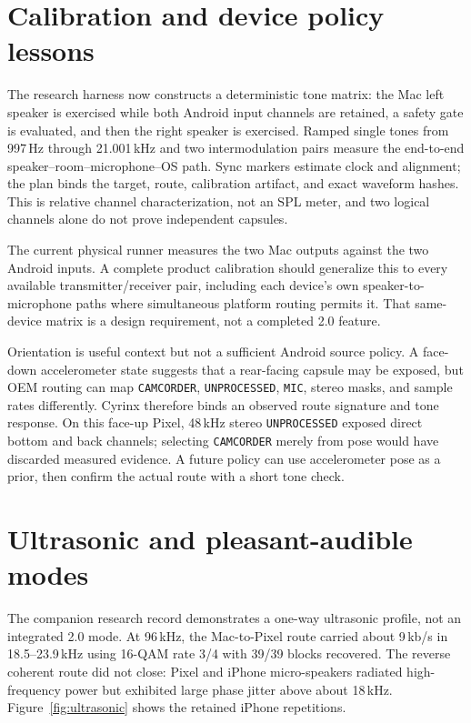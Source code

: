 \documentclass[11pt]{article}
\begin{document}
\section{Calibration and device policy lessons}
\label{sec:calibration}

The research harness now constructs a deterministic tone matrix: the Mac left
speaker is exercised while both Android input channels are retained, a safety
gate is evaluated, and then the right speaker is exercised. Ramped single
tones from 997\,Hz through 21.001\,kHz and two intermodulation pairs measure the
end-to-end speaker--room--microphone--OS path. Sync markers estimate clock and
alignment; the plan binds the target, route, calibration artifact, and exact
waveform hashes. This is relative channel characterization, not an SPL meter,
and two logical channels alone do not prove independent capsules.

The current physical runner measures the two Mac outputs against the two
Android inputs. A complete product calibration should generalize this to every
available transmitter/receiver pair, including each device's own speaker-to-
microphone paths where simultaneous platform routing permits it. That
same-device matrix is a design requirement, not a completed 2.0 feature.

Orientation is useful context but not a sufficient Android source policy. A
face-down accelerometer state suggests that a rear-facing capsule may be
exposed, but OEM routing can map \texttt{CAMCORDER}, \texttt{UNPROCESSED},
\texttt{MIC}, stereo masks, and sample rates differently. Cyrinx therefore
binds an observed route signature and tone response. On this face-up Pixel,
48\,kHz stereo \texttt{UNPROCESSED} exposed direct bottom and back channels;
selecting \texttt{CAMCORDER} merely from pose would have discarded measured
evidence. A future policy can use accelerometer pose as a prior, then confirm
the actual route with a short tone check.

\section{Ultrasonic and pleasant-audible modes}
\label{sec:ultrasonic}

The companion research record demonstrates a one-way ultrasonic profile, not
an integrated 2.0 mode. At 96\,kHz, the Mac-to-Pixel route carried about
9\,kb/s in 18.5--23.9\,kHz using 16-QAM rate 3/4 with 39/39 blocks recovered.
The reverse coherent route did not close: Pixel and iPhone micro-speakers
radiated high-frequency power but exhibited large phase jitter above about
18\,kHz. Figure~\ref{fig:ultrasonic} shows the retained iPhone repetitions.
\end{document}

